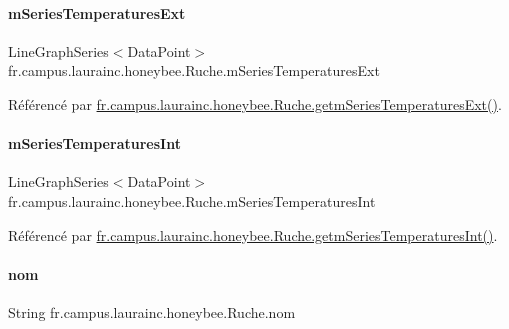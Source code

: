\paragraph{\texorpdfstring{m\+Series\+Temperatures\+Ext}{mSeriesTemperaturesExt}}
{\footnotesize\ttfamily Line\+Graph\+Series$<$Data\+Point$>$ fr.\+campus.\+laurainc.\+honeybee.\+Ruche.\+m\+Series\+Temperatures\+Ext\hspace{0.3cm}{\ttfamily [private]}}



Référencé par \hyperlink{classfr_1_1campus_1_1laurainc_1_1honeybee_1_1_ruche_ace771aab9a10f7cf13050197a85c41f7}{fr.\+campus.\+laurainc.\+honeybee.\+Ruche.\+getm\+Series\+Temperatures\+Ext()}.

\mbox{\label{classfr_1_1campus_1_1laurainc_1_1honeybee_1_1_ruche_a0fe6febbc698e5c0ed34783a9cbb7719}} 
\paragraph{\texorpdfstring{m\+Series\+Temperatures\+Int}{mSeriesTemperaturesInt}}
{\footnotesize\ttfamily Line\+Graph\+Series$<$Data\+Point$>$ fr.\+campus.\+laurainc.\+honeybee.\+Ruche.\+m\+Series\+Temperatures\+Int\hspace{0.3cm}{\ttfamily [private]}}



Référencé par \hyperlink{classfr_1_1campus_1_1laurainc_1_1honeybee_1_1_ruche_ae3f7d6c16444905061f13fe14eb21d69}{fr.\+campus.\+laurainc.\+honeybee.\+Ruche.\+getm\+Series\+Temperatures\+Int()}.

\mbox{\label{classfr_1_1campus_1_1laurainc_1_1honeybee_1_1_ruche_ae18dd003de10a89841422fd96b1139d7}} 
\paragraph{\texorpdfstring{nom}{nom}}
{\footnotesize\ttfamily String fr.\+campus.\+laurainc.\+honeybee.\+Ruche.\+nom\hspace{0.3cm}{\ttfamily [private]}}



